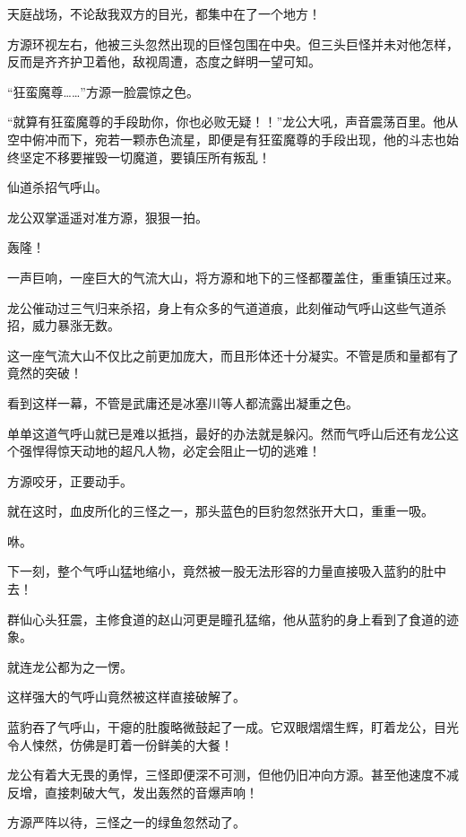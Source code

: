 
\begin{this_body}

天庭战场，不论敌我双方的目光，都集中在了一个地方！

方源环视左右，他被三头忽然出现的巨怪包围在中央。但三头巨怪并未对他怎样，反而是齐齐护卫着他，敌视周遭，态度之鲜明一望可知。

“狂蛮魔尊……”方源一脸震惊之色。

“就算有狂蛮魔尊的手段助你，你也必败无疑！！”龙公大吼，声音震荡百里。他从空中俯冲而下，宛若一颗赤色流星，即便是有狂蛮魔尊的手段出现，他的斗志也始终坚定不移要摧毁一切魔道，要镇压所有叛乱！

仙道杀招气呼山。

龙公双掌遥遥对准方源，狠狠一拍。

轰隆！

一声巨响，一座巨大的气流大山，将方源和地下的三怪都覆盖住，重重镇压过来。

龙公催动过三气归来杀招，身上有众多的气道道痕，此刻催动气呼山这些气道杀招，威力暴涨无数。

这一座气流大山不仅比之前更加庞大，而且形体还十分凝实。不管是质和量都有了竟然的突破！

看到这样一幕，不管是武庸还是冰塞川等人都流露出凝重之色。

单单这道气呼山就已是难以抵挡，最好的办法就是躲闪。然而气呼山后还有龙公这个强悍得惊天动地的超凡人物，必定会阻止一切的逃难！

方源咬牙，正要动手。

就在这时，血皮所化的三怪之一，那头蓝色的巨豹忽然张开大口，重重一吸。

咻。

下一刻，整个气呼山猛地缩小，竟然被一股无法形容的力量直接吸入蓝豹的肚中去！

群仙心头狂震，主修食道的赵山河更是瞳孔猛缩，他从蓝豹的身上看到了食道的迹象。

就连龙公都为之一愣。

这样强大的气呼山竟然被这样直接破解了。

蓝豹吞了气呼山，干瘪的肚腹略微鼓起了一成。它双眼熠熠生辉，盯着龙公，目光令人悚然，仿佛是盯着一份鲜美的大餐！

龙公有着大无畏的勇悍，三怪即便深不可测，但他仍旧冲向方源。甚至他速度不减反增，直接刺破大气，发出轰然的音爆声响！

方源严阵以待，三怪之一的绿鱼忽然动了。


\end{this_body}
